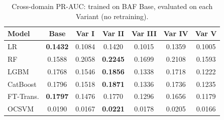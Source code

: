 \begin{table}[H]
\centering
\caption{Cross-domain PR-AUC: trained on BAF Base, evaluated on each Variant (no retraining).}
\label{tab:crossdomain_prauc}
\begin{tabular}{l c c c c c c}
\toprule
Model & Base & Var I & Var II & Var III & Var IV & Var V \\
\midrule
LR         & \textbf{0.1432} & 0.1084 & 0.1420 & 0.1015 & 0.1359 & 0.1005 \\
RF         & 0.1588 & 0.2058 & \textbf{0.2245} & 0.1699 & 0.2108 & 0.1593 \\
LGBM       & 0.1768 & 0.1546 & \textbf{0.1856} & 0.1338 & 0.1718 & 0.1222 \\
CatBoost   & 0.1796 & 0.1518 & \textbf{0.1871} & 0.1336 & 0.1736 & 0.1235 \\
FT-Trans.  & \textbf{0.1797} & 0.1476 & 0.1770 & 0.1296 & 0.1656 & 0.1179 \\
OCSVM      & 0.0190 & 0.0167 & \textbf{0.0221} & 0.0178 & 0.0205 & 0.0166 \\
\bottomrule
\end{tabular}
\end{table}